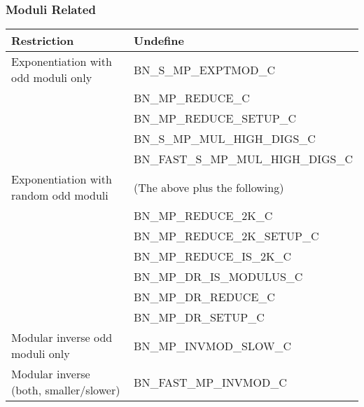 \documentclass[synpaper]{book}
\begin{document}
\subsubsection{Moduli Related}
\begin{small}
\begin{center}
\begin{tabular}{|l|l|}
\hline \textbf{Restriction} & \textbf{Undefine} \\
\hline Exponentiation with odd moduli only & BN\_S\_MP\_EXPTMOD\_C \\
                                           & BN\_MP\_REDUCE\_C \\
                                           & BN\_MP\_REDUCE\_SETUP\_C \\
                                           & BN\_S\_MP\_MUL\_HIGH\_DIGS\_C \\
                                           & BN\_FAST\_S\_MP\_MUL\_HIGH\_DIGS\_C \\
\hline Exponentiation with random odd moduli & (The above plus the following) \\
                                           & BN\_MP\_REDUCE\_2K\_C \\
                                           & BN\_MP\_REDUCE\_2K\_SETUP\_C \\
                                           & BN\_MP\_REDUCE\_IS\_2K\_C \\
                                           & BN\_MP\_DR\_IS\_MODULUS\_C \\
                                           & BN\_MP\_DR\_REDUCE\_C \\
                                           & BN\_MP\_DR\_SETUP\_C \\
\hline Modular inverse odd moduli only     & BN\_MP\_INVMOD\_SLOW\_C \\
\hline Modular inverse (both, smaller/slower) & BN\_FAST\_MP\_INVMOD\_C \\
\hline
\end{tabular}
\end{center}
\end{small}
\end{document}
